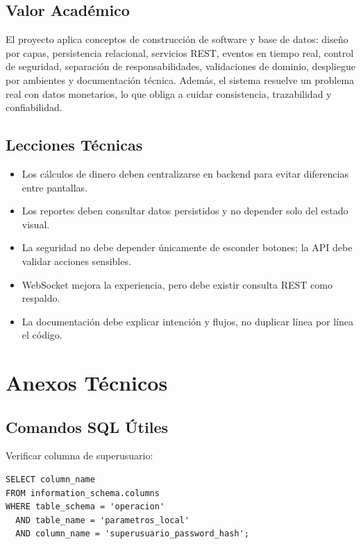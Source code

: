 \documentclass[11pt,letterpaper,openany]{report}
\begin{document}
\section{Valor Académico}

El proyecto aplica conceptos de construcción de software y base de datos: diseño por capas, persistencia relacional, servicios REST, eventos en tiempo real, control de seguridad, separación de responsabilidades, validaciones de dominio, despliegue por ambientes y documentación técnica. Además, el sistema resuelve un problema real con datos monetarios, lo que obliga a cuidar consistencia, trazabilidad y confiabilidad.

\section{Lecciones Técnicas}

\begin{itemize}
  \item Los cálculos de dinero deben centralizarse en backend para evitar diferencias entre pantallas.
  \item Los reportes deben consultar datos persistidos y no depender solo del estado visual.
  \item La seguridad no debe depender únicamente de esconder botones; la API debe validar acciones sensibles.
  \item WebSocket mejora la experiencia, pero debe existir consulta REST como respaldo.
  \item La documentación debe explicar intención y flujos, no duplicar línea por línea el código.
\end{itemize}

\chapter{Anexos Técnicos}

\section{Comandos SQL Útiles}

Verificar columna de superusuario:

\begin{lstlisting}
SELECT column_name
FROM information_schema.columns
WHERE table_schema = 'operacion'
  AND table_name = 'parametros_local'
  AND column_name = 'superusuario_password_hash';
\end{lstlisting}
\end{document}
